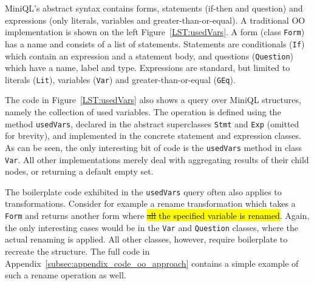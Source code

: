 MiniQL's abstract syntax contains forms, statements (if-then and question) and expressions (only literals, variables and greater-than-or-equal).
A traditional OO implementation is shown on the left Figure~\ref{LST:usedVars}.
A form (class \lstinline{Form}) has a name and consists of a list of statements.
Statements are conditionals (\lstinline{If}) which contain an expression and a statement body, and questions (\lstinline{Question}) which have a name, label and type. Expressions are standard, but limited to literals (\lstinline{Lit}), variables (\lstinline{Var}) and greater-than-or-equal (\lstinline{GEq}).



The code in Figure~\ref{LST:usedVars} also shows a query over MiniQL structures, namely the collection of used variables.
The operation is defined using the method \lstinline{usedVars}, declared in the abstract superclasses  \lstinline{Stmt} and \lstinline{Exp} (omitted for brevity), and implemented in the concrete statement and expression classes.
As can be seen, the only interesting bit of code is the \lstinline{usedVars} method in class \lstinline{Var}.
All other implementations merely deal with aggregating results of their child nodes, or returning a default empty set.

The boilerplate code exhibited in the \lstinline{usedVars} query often
also applies to transformations.  Consider for example a rename
transformation which takes a \lstinline{Form} and returns another form
where \hl{\sout{all} the specified variable is renamed}.  Again, the only interesting cases would be
in the \lstinline{Var} and {\small\texttt{Question}} classes, where the actual renaming is
applied. All other classes, however, require boilerplate to recreate
the structure. The full code in
Appendix~\ref{subsec:appendix_code_oo_approach} contains a simple
example of such a rename operation as well.



